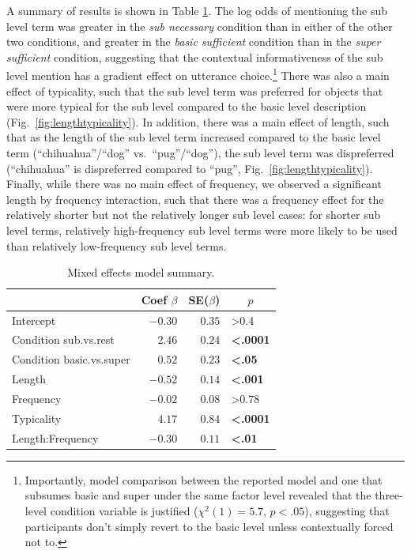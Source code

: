 \documentclass[10pt,letterpaper]{article}
\newcommand{\tableref}[1]{Table \ref{#1}}
\newcommand{\figref}[1]{Fig.~\ref{#1}}
\begin{document}
A summary of results is shown in \tableref{tab:modelresults}. The log odds of mentioning the sub level term was greater in the \emph{sub necessary} condition than in either of the other two conditions, and greater in the \emph{basic sufficient} condition than in the \emph{super sufficient} condition, suggesting that the contextual informativeness of the sub level mention has a gradient effect on utterance choice.\footnote{Importantly, model comparison between the reported model and one that subsumes basic and super under the same factor level revealed that the three-level condition variable is justified ($\chi ^2 (1) = 5.7$, $p < .05$), suggesting that participants don't simply revert to the basic level unless contextually forced not to.} There was also a main effect of typicality, such that the sub level term was preferred for objects that were more typical for the sub level compared to the basic level  description (\figref{fig:lengthtypicality}). In addition, there was a main effect of length, such that as the length of the sub level term increased compared to the basic level term (``chihuahua''/``dog'' vs.~``pug''/``dog''), the sub level term was dispreferred (``chihuahua'' is dispreferred compared to ``pug'', \figref{fig:lengthtypicality}). Finally, while there was no main effect of frequency, we observed a significant length by frequency interaction, such that there was a frequency effect for the relatively shorter but not the relatively longer sub level cases: for shorter sub level terms, relatively high-frequency sub level terms were more likely to be used than relatively low-frequency sub level terms. 

\begin{table}[tbp]
\caption{Mixed effects model summary.}
\begin{center}
\begin{tabular}{lrrl}
\toprule
\multicolumn{1}{l}{}&\multicolumn{1}{c}{Coef $\beta$}&\multicolumn{1}{c}{SE($\beta$)}&\multicolumn{1}{c}{$p$}\tabularnewline
\midrule
Intercept&$-0.30$&$0.35$&\textgreater0.4\tabularnewline
Condition sub.vs.rest&$ 2.46$&$0.24$&\textbf{\textless.0001}\tabularnewline
Condition basic.vs.super&$ 0.52$&$0.23$&\textbf{\textless.05}\tabularnewline
Length&$-0.52$&$0.14$&\textbf{\textless.001}\tabularnewline
Frequency&$-0.02$&$0.08$&\textgreater0.78\tabularnewline
Typicality&$ 4.17$&$0.84$&\textbf{\textless.0001}\tabularnewline
Length:Frequency&$-0.30$&$0.11$&\textbf{\textless.01}\tabularnewline
\bottomrule
\end{tabular}\end{center}
\label{tab:modelresults}
\end{table}
\end{document}
